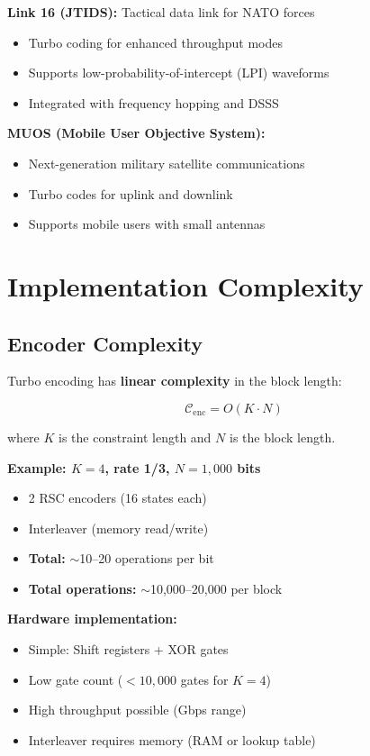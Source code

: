 \textbf{Link 16 (JTIDS):} Tactical data link for NATO forces
\begin{itemize}
\item Turbo coding for enhanced throughput modes
\item Supports low-probability-of-intercept (LPI) waveforms
\item Integrated with frequency hopping and DSSS
\end{itemize}

\textbf{MUOS (Mobile User Objective System):}
\begin{itemize}
\item Next-generation military satellite communications
\item Turbo codes for uplink and downlink
\item Supports mobile users with small antennas
\end{itemize}

\section{Implementation Complexity}

\subsection{Encoder Complexity}

Turbo encoding has \textbf{linear complexity} in the block length:

\begin{equation}
\mathcal{C}_{\text{enc}} = O(K \cdot N)
\end{equation}

where $K$ is the constraint length and $N$ is the block length.

\textbf{Example: $K=4$, rate 1/3, $N=1{,}000$ bits}
\begin{itemize}
\item 2 RSC encoders (16 states each)
\item Interleaver (memory read/write)
\item \textbf{Total:} $\sim$10--20 operations per bit
\item \textbf{Total operations:} $\sim$10,000--20,000 per block
\end{itemize}

\textbf{Hardware implementation:}
\begin{itemize}
\item Simple: Shift registers + XOR gates
\item Low gate count ($< 10{,}000$ gates for $K=4$)
\item High throughput possible (Gbps range)
\item Interleaver requires memory (RAM or lookup table)
\end{itemize}

